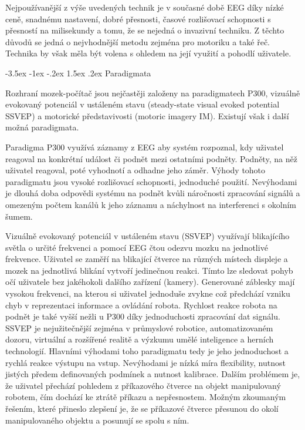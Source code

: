 \documentclass[a4paper,10pt]{article}
\makeatletter
\theoremstyle{definition}
\renewcommand\section{\@startsection {section}{1}{\z@}%
                                   {-3.5ex \@plus -1ex \@minus -.2ex}%
                                   {1.5ex \@plus.2ex}%
                                   {\large\bfseries}}
\makeatother
\begin{document}
Nejpoužívanější z výše uvedených technik je v současné době EEG díky nízké ceně, snadnému nastavení, dobré přesnosti, časové rozlišovací schopnosti s přesností na milisekundy a tomu, že se nejedná o invazivní techniku. Z těchto důvodů se jedná o nejvhodnější metodu zejména pro motoriku a také řeč. Technika by však měla být volena s ohledem na její využití a pohodlí uživatele.\cite{AI2023obrazovky, article, athanasiou2017rehabilitation, article3, s23136001obrazekmozkusesenzory}

\newpage
\section{Paradigmata}
\label{sec:3}

Rozhraní mozek-počítač jsou nejčastěji založeny na paradigmatech P300, vizuálně evokovaný potenciál v ustáleném stavu (steady-state visual evoked potential SSVEP) a motorické představivosti (motoric imagery IM). Existují však i další možná paradigmata.

Paradigma P300 využívá záznamy z EEG aby systém rozpoznal, kdy uživatel reagoval na konkrétní událost či podnět mezi ostatními podněty. Podněty, na něž uživatel reagoval, poté vyhodnotí a odhadne jeho záměr. Výhody tohoto paradigmatu jsou vysoké rozlišovací schopnosti, jednoduché použití. Nevýhodami je dlouhá doba odpovědi systému na podnět kvůli náročnosti zpracování signálů a omezeným počtem kanálů k jeho záznamu a náchylnost na interferenci s okolním šumem.

Vizuálně evokovaný potenciál v ustáleném stavu (SSVEP) využívají blikajícího světla o určité frekvenci a pomocí EEG čtou odezvu mozku na jednotlivé frekvence. Uživatel se zaměří na blikající čtverce na různých místech displeje a mozek na jednotlivá blikání vytvoří jedinečnou reakci. Tímto lze sledovat pohyb očí uživatele bez jakéhokoli dalšího zařízení (kamery). Generované záblesky mají vysokou frekvenci, na kterou si uživatel jednoduše zvykne což předchází vzniku chyb v reprezentaci informace a ovládání robota. Rychlost reakce robota na podnět je také vyšší nežli u P300 díky jednoduchosti zpracování dat signálu. SSVEP je nejužitečnější zejména v průmyslové robotice, automatizovaném dozoru, virtuální a rozšířené realitě a výzkumu umělé inteligence a herních technologií. Hlavními výhodami toho paradigmatu tedy je jeho jednoduchost a rychlá reakce výstupu na vstup. Nevýhodami je nízká míra flexibility, nutnost jistých předem definovaných podmínek a nutnost kalibrace. Dalším problémem je, že uživatel přechází pohledem z příkazového čtverce na objekt manipulovaný robotem, čím dochází ke ztrátě příkazu a nepřesnostem. Možným zkoumaným řešením, které přineslo zlepšení je, že se příkazové čtverce přesunou do okolí manipulovaného objektu a posunují se spolu s ním.
\end{document}
